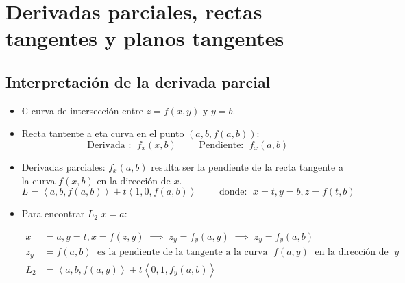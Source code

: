 




\section{Derivadas parciales, rectas tangentes y planos tangentes}

\subsection{Interpretación de la derivada parcial}
\begin{itemize}
    \item $\mathbb{C}$ curva de intersección entre $z=f(x,y)$ y $y=b$.
    \item Recta tantente a eta curva en el punto $(a,b,f(a,b))$:
        \[
          \text{  Derivada : }\; f_x(x,b) \quad \quad \text{  Pendiente:  }\; f_x(a,b)
        \]
    
    \item Derivadas parciales: $f_x(a,b)$ resulta ser la pendiente de la recta tangente a la curva $f(x,b)$ en la dirección de $x$.
        \[
          L = \left\langle a,b,f(a,b) \right\rangle + t \left\langle 1,0,f(a,b) \right\rangle \quad \quad \text{  donde:  } \; x =t, y=b,z=f(t,b) 
        \]
    
    \item  Para encontrar $L_2$ $x=a$:
        \begin{center}
           \begin{align*}
               x&=a, y=t, x=f(z,y) \;\implies\; z_y=f_y(a,y) \; \implies \; z_y=f_y(a,b) \\ 
               z_y&=f(a,b) \; \text{  es la pendiente de la tangente  a la curva   }\; f(a,y) \; \text{  en la dirección de   }\; y \\   
               L_2 &= \left\langle a,b,f(a,y) \right\rangle + t \left\langle 0,1,f_y(a,b) \right\rangle \\ 
           \end{align*}
        \end{center}
    

\end{itemize}
